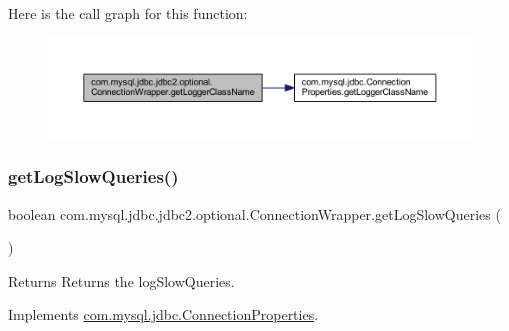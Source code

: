 Here is the call graph for this function\+:
\nopagebreak
\begin{figure}[H]
\begin{center}
\leavevmode
\includegraphics[width=350pt]{classcom_1_1mysql_1_1jdbc_1_1jdbc2_1_1optional_1_1_connection_wrapper_a58f18c319fbdf5a591c9e602472e35da_cgraph}
\end{center}
\end{figure}
\mbox{\label{classcom_1_1mysql_1_1jdbc_1_1jdbc2_1_1optional_1_1_connection_wrapper_ad4c40181a8ac4df23cc62cdfa67068ad}} 
\subsubsection{\texorpdfstring{get\+Log\+Slow\+Queries()}{getLogSlowQueries()}}
{\footnotesize\ttfamily boolean com.\+mysql.\+jdbc.\+jdbc2.\+optional.\+Connection\+Wrapper.\+get\+Log\+Slow\+Queries (\begin{DoxyParamCaption}{ }\end{DoxyParamCaption})}

\begin{DoxyReturn}{Returns}
Returns the log\+Slow\+Queries. 
\end{DoxyReturn}


Implements \mbox{\hyperlink{interfacecom_1_1mysql_1_1jdbc_1_1_connection_properties_a82c72191f1132e06d2bbe504acde3399}{com.\+mysql.\+jdbc.\+Connection\+Properties}}.

